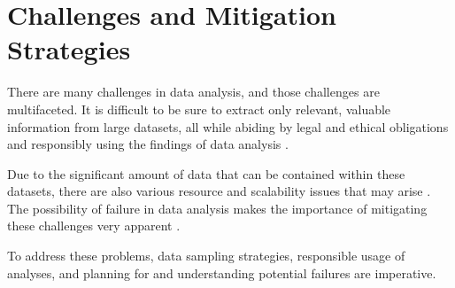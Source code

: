 \section{Challenges and Mitigation Strategies}
There are many challenges in data analysis, and those challenges are multifaceted. It is difficult to be sure to extract only relevant, valuable information from large datasets, all while abiding by legal and ethical obligations and responsibly using the findings of data analysis \citep{nayak2002intelligent, choenni2021using}.

Due to the significant amount of data that can be contained within these datasets, there are also various resource and scalability issues that may arise \citep{duffield2014challenges}. The possibility of failure in data analysis makes the importance of mitigating these challenges very apparent \citep{staegemann2020determining}.

To address these problems, data sampling strategies, responsible usage of analyses, and planning for and understanding potential failures are imperative.